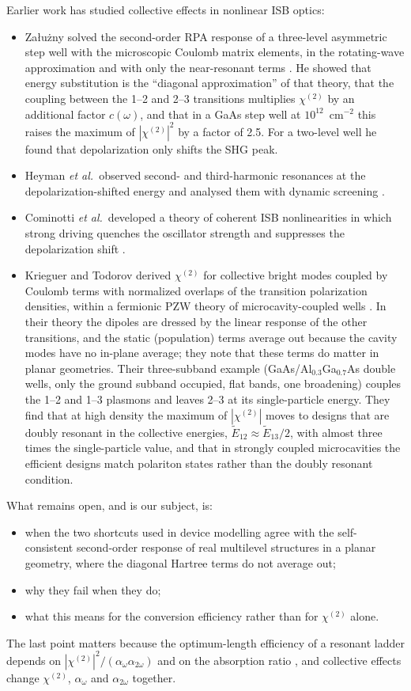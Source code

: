 \documentclass[11pt]{article}
\newcommand{\chitwo}{\chi^{(2)}}
\newcommand{\aw}{\alpha_{\omega}}
\newcommand{\aww}{\alpha_{2\omega}}
\begin{document}
Earlier work has studied collective effects in nonlinear ISB optics:
\begin{itemize}
\item Załużny solved the second-order RPA response of a three-level asymmetric step well with the microscopic Coulomb matrix elements, in the rotating-wave approximation and with only the near-resonant terms \cite{Zaluzny1995}. He showed that energy substitution is the ``diagonal approximation'' of that theory, that the coupling between the 1--2 and 2--3 transitions multiplies $\chitwo$ by an additional factor $c(\omega)$, and that in a GaAs step well at $10^{12}$~cm$^{-2}$ this raises the maximum of $|\chitwo|^2$ by a factor of 2.5. For a two-level well he found that depolarization only shifts the SHG peak.
\item Heyman \emph{et al.}\ observed second- and third-harmonic resonances at the depolarization-shifted energy and analysed them with dynamic screening \cite{Heyman1994}.
\item Cominotti \emph{et al.}\ developed a theory of coherent ISB nonlinearities in which strong driving quenches the oscillator strength and suppresses the depolarization shift \cite{Cominotti2023}.
\item Krieguer and Todorov derived $\chitwo$ for collective bright modes coupled by Coulomb terms with normalized overlaps of the transition polarization densities, within a fermionic PZW theory of microcavity-coupled wells \cite{Krieguer2024}. In their theory the dipoles are dressed by the linear response of the other transitions, and the static (population) terms average out because the cavity modes have no in-plane average; they note that these terms do matter in planar geometries. Their three-subband example (GaAs/Al$_{0.3}$Ga$_{0.7}$As double wells, only the ground subband occupied, flat bands, one broadening) couples the 1--2 and 1--3 plasmons and leaves 2--3 at its single-particle energy. They find that at high density the maximum of $|\chitwo|$ moves to designs that are doubly resonant in the collective energies, $\tilde E_{12}\approx\tilde E_{13}/2$, with almost three times the single-particle value, and that in strongly coupled microcavities the efficient designs match polariton states rather than the doubly resonant condition.
\end{itemize}

What remains open, and is our subject, is:
\begin{itemize}
\item when the two shortcuts used in device modelling agree with the self-consistent second-order response of real multilevel structures in a planar geometry, where the diagonal Hartree terms do not average out;
\item why they fail when they do;
\item what this means for the conversion efficiency rather than for $\chitwo$ alone.
\end{itemize}
The last point matters because the optimum-length efficiency of a resonant ladder depends on $|\chitwo|^2/(\aw\aww)$ and on the absorption ratio \cite{OwnbyNL02}, and collective effects change $\chitwo$, $\aw$ and $\aww$ together.
\end{document}
